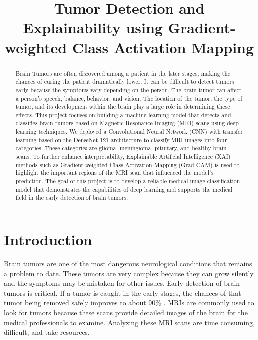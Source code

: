 \documentclass[conference]{IEEEtran}
\begin{document}
\title{Tumor Detection and Explainability using Gradient-weighted Class Activation Mapping}

\author{
}


\maketitle
\begin{abstract}
Brain Tumors are often discovered among a patient in the later stages, making the chances of curing the patient dramatically lower. It can be difficult to detect tumors early because the symptoms vary depending on the person. The brain tumor can affect a person's speech, balance, behavior, and vision. The location of the tumor, the type of tumor, and its development within the brain play a large role in determining these effects. This project focuses on building a machine learning model that detects and classifies brain tumors based on Magnetic Resonance Imaging (MRI) scans using deep learning techniques. We deployed a Convolutional Neural Network (CNN) with transfer learning based on the DenseNet-121 architecture to classify MRI images into four categories. These categories are glioma, meningioma, pituitary, and healthy brain scans. To further enhance interpretability, Explainable Artificial Intelligence (XAI) methods such as Gradient-weighted Class Activation Mapping (Grad-CAM) is used to highlight the important regions of the MRI scan that influenced the model's prediction. The goal of this project is to develop a reliable medical image classification model that demonstrates the capabilities of deep learning and supports the medical field in the early detection of brain tumors.
\end{abstract}

\section{Introduction}
Brain tumors are one of the most dangerous neurological conditions that remains a problem to date. These tumors are very complex because they can grow silently and the symptoms may be mistaken for other issues. Early detection of brain tumors is critical. If a tumor is caught in the early stages, the chances of that tumor being removed safely improves to about 90\% \cite{ncneurospine}. MRIs are commonly used to look for tumors because these scans provide detailed images of the brain for the medical professionals to examine. Analyzing these MRI scans are time consuming, difficult, and take resources.
\end{document}

